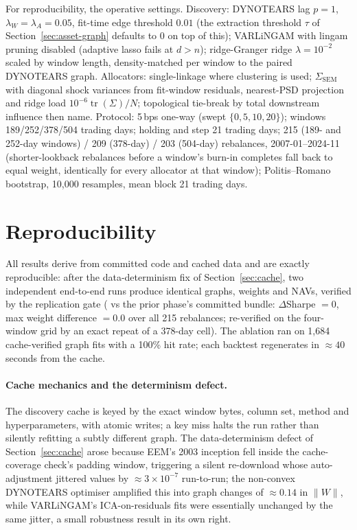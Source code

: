 For reproducibility, the operative settings. Discovery: DYNOTEARS lag
$p=1$, $\lambda_W=\lambda_A=0.05$, fit-time edge threshold $0.01$ (the
extraction threshold $\tau$ of Section~\ref{sec:asset-graph} defaults to $0$
on top of this); VARLiNGAM with lingam pruning disabled (adaptive lasso
fails at $d>n$); ridge-Granger ridge $\lambda=10^{-2}$ scaled by window length,
density-matched per window to the paired DYNOTEARS graph.
Allocators: single-linkage where clustering is used;
$\Sigma_{\mathrm{SEM}}$ with diagonal shock variances from fit-window
residuals, nearest-PSD projection and ridge load
$10^{-6}\operatorname{tr}(\Sigma)/N$; topological tie-break by
total downstream influence then name.
Protocol: 5\,bps one-way (swept $\{0,5,10,20\}$); windows
189/252/378/504 trading days; holding and step 21 trading days; 215
(189- and 252-day windows) / 209 (378-day) / 203 (504-day) rebalances,
2007-01--2024-11
(shorter-lookback rebalances before a window's burn-in completes fall back
to equal weight, identically for every allocator at that window);
Politis--Romano bootstrap, 10{,}000 resamples, mean block 21 trading days.

\section{Reproducibility}

All results derive from committed code and cached data and are
exactly reproducible: after the data-determinism fix of
Section~\ref{sec:cache},
two independent end-to-end runs produce identical graphs, weights and
NAVs, verified by the replication gate (\skelsamp{} vs the prior phase's committed
bundle: $\Delta$Sharpe $= 0$, max weight difference $= 0.0$ over all 215
rebalances; re-verified on the four-window grid by an exact repeat
of a 378-day cell). The ablation ran on 1{,}684 cache-verified graph fits
with a 100\% hit rate; each backtest regenerates in ${\approx}40$ seconds
from the cache.

\paragraph{Cache mechanics and the determinism defect.} The discovery
cache is keyed by the exact window bytes, column set, method and
hyperparameters, with atomic writes; a key miss halts the run rather
than silently refitting a subtly different graph. The data-determinism
defect of Section~\ref{sec:cache} arose because EEM's 2003 inception
fell inside the cache-coverage check's padding window, triggering a
silent re-download whose auto-adjustment jittered values by
${\approx}3\times10^{-7}$ run-to-run; the non-convex DYNOTEARS
optimiser amplified this into graph changes of ${\approx}0.14$ in
$\lVert W\rVert$, while VARLiNGAM's ICA-on-residuals fits were
essentially unchanged by the same jitter, a small robustness result in
its own right.

